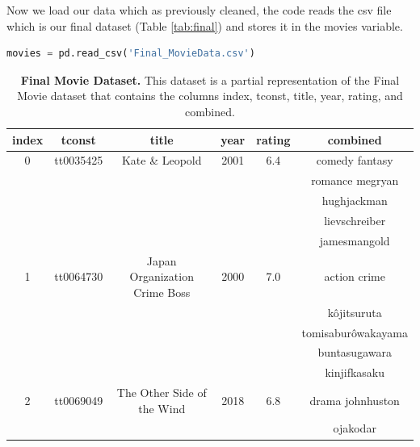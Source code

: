 Now we load our data which as previously cleaned, the code reads the csv file which is our final dataset (Table \ref{tab:final}) and stores it in the movies variable.

\begin{lstlisting}[language=python]
movies = pd.read_csv('Final_MovieData.csv')
\end{lstlisting}

\begin{table}[ht]
	\centering
	\caption{\textbf{Final Movie Dataset.} This dataset is a partial representation of the Final Movie dataset that contains the columns index, tconst, title, year, rating, and combined.}	
	\footnotesize
	\begin{tabular}{cccccc}
		\toprule
		index    & tconst    & title                         & year     & rating   & combined           \\
		\midrule
		0        & tt0035425 & Kate \& Leopold               & 2001     & 6.4      & comedy fantasy     \\
		         &           &                               &          &          & romance megryan    \\
		         &           &                               &          &          & hughjackman        \\
		         &           &                               &          &          & lievschreiber      \\
		         &           &                               &          &          & jamesmangold       \\
		1        & tt0064730 & Japan Organization Crime Boss & 2000     & 7.0      & action crime       \\
		         &           &                               &          &          & kôjitsuruta        \\
		         &           &                               &          &          & tomisaburôwakayama \\
		         &           &                               &          &          & buntasugawara      \\
		         &           &                               &          &          & kinjifkasaku       \\
		2        & tt0069049 & The Other Side of the Wind    & 2018     & 6.8      & drama johnhuston   \\
		         &           &                               &          &          & ojakodar           \\

\end{tabular}
\end{table}
